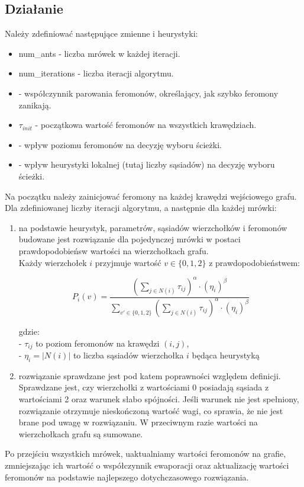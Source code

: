 \subsection{Działanie}
Należy zdefiniować następujące zmienne i heurystyki:
\begin{itemize}
    \item num\_ants - liczba mrówek w każdej iteracji.
    \item num\_iterations - liczba iteracji algorytmu.
    \item \textbf{\rho} - współczynnik parowania feromonów, określający, jak szybko feromony zanikają.
    \item $\tau_{init}$ - początkowa wartość feromonów na wszystkich krawędziach.
    \item \textbf{\alpha} - wpływ poziomu feromonów na decyzję wyboru ścieżki.
    \item \textbf{\beta} - wpływ heurystyki lokalnej (tutaj liczby sąsiadów) na decyzję wyboru ścieżki.
\end{itemize}
Na początku należy zainicjować feromony na każdej krawędzi wejściowego grafu.\\
Dla zdefiniowanej liczby iteracji algorytmu, a następnie dla każdej mrówki:
\begin{enumerate}
    \item na podstawie heurystyk, parametrów, sąsiadów wierzchołków i feromonów budowane jest rozwiązanie dla pojedynczej mrówki w postaci prawdopodobieńsw wartości na wierzchołkach grafu.\\
    Każdy wierzchołek \( i \) przyjmuje wartość \( v \in \{0,1,2\} \) z prawdopodobieństwem:

\[
P_i(v) = \frac{ \left( \sum\limits_{j \in N(i)} \tau_{ij} \right)^\alpha \cdot (\eta_i)^\beta }
{\sum\limits_{v' \in \{0,1,2\}} \left( \sum\limits_{j \in N(i)} \tau_{ij} \right)^\alpha \cdot (\eta_i)^\beta}
\]

gdzie:\\
- \( \tau_{ij} \) to poziom feromonów na krawędzi \( (i,j) \),\\
- \( \eta_i = |N(i)| \) to liczba sąsiadów wierzchołka \( i \) będąca heurystyką

    \item rozwiązanie sprawdzane jest pod katem poprawności względem definicji. Sprawdzane jest, czy wierzchołki z wartościami 0 posiadają sąsiada z wartościami 2 oraz warunek słabo spójności. Jeśli warunek nie jest spełniony, rozwiązanie otrzymuje nieskończoną wartość wagi, co sprawia, że nie jest brane pod uwagę w rozwiązaniu. W przeciwnym razie wartości na wierzchołkach grafu są sumowane.
\end{enumerate}
Po przejściu wszystkich mrówek, uaktualniamy wartości feromonów na grafie, zmniejszając ich wartość o współczynnik ewaporacji oraz aktualizację wartości feromonów na podstawie najlepszego dotychczasowego rozwiązania.

